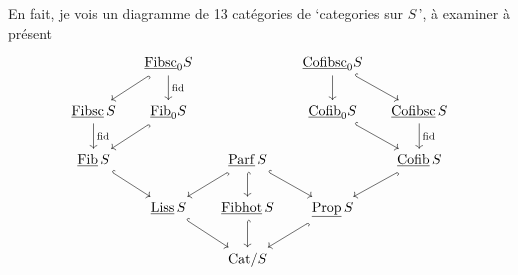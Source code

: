 En fait, je vois un diagramme de 13 catégories de `categories sur $S$\,', à examiner à présent %
\[
\begin{tikzcd}[column sep=small]
 & \ul{Fibsc}_0S \arrow[dl, hook] \arrow[d, "\mathrm{fid}"] & & \ul{Cofibsc}_0S \arrow[d] \arrow[dr, hook] & \\
\ul{Fibsc}\,S \arrow[d, "\mathrm{fid}"] & \ul{Fib}_0S \arrow[dl, hook] & & \ul{Cofib}_0S \arrow[dr, hook] & \ul{Cofibsc}\,S \arrow[d, "\mathrm{fid}"] \\
\ul{Fib}\,S \arrow[dr, hook] & & \ul{Parf}\,S \arrow[dl, hook] \arrow[d, hook] \arrow[dr, hook] & & \ul{Cofib}\,S \arrow[dl, hook] \\
 & \ul{Liss}\,S \arrow[dr, hook] & \ul{Fibhot}\,S \arrow[d, hook] & \ul{Prop}\,S \arrow[dl, hook] & \\
 & & \mathrm{Cat}/S & &
\end{tikzcd}
\]

